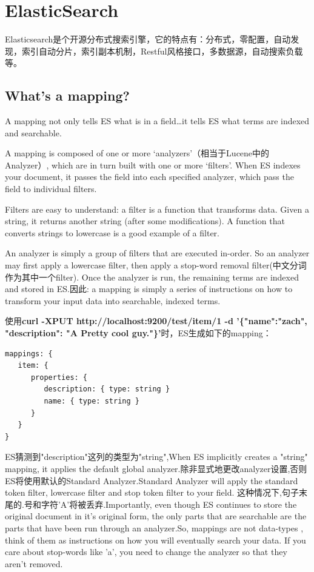 \section{ElasticSearch}
\par Elasticsearch是个开源分布式搜索引擎，它的特点有：分布式，零配置，自动发现，索引自动分片，索引副本机制，Restful风格接口，多数据源，自动搜索负载等。
\subsection{What's a mapping?}
\par A mapping not only tells ES what is in a field…it tells ES what terms are indexed and searchable.
\par A mapping is composed of one or more ‘analyzers’（相当于Lucene中的Analyzer）, which are in turn built with one or more ‘filters’. When ES indexes your document, it passes the field into each specified analyzer, which pass the field to individual filters.
\par Filters are easy to understand: a filter is a function that transforms data. Given a string, it returns another string (after some modifications). A function that converts strings to lowercase is a good example of a filter.
\par An analyzer is simply a group of filters that are executed in-order. So an analyzer may first apply a lowercase filter, then apply a stop-word removal filter(中文分词作为其中一个filter). Once the analyzer is run, the remaining terms are indexed and stored in ES.因此: a mapping is simply a series of instructions on how to transform your input data into searchable, indexed terms.
\par 使用\textbf{curl -XPUT http://localhost:9200/test/item/1 -d '\{"name":"zach", "description": "A Pretty cool guy."\}'}时，ES生成如下的mapping：
\begin{verbatim}
mappings: {
   item: {
      properties: {
         description: { type: string }
         name: { type: string }
      }
   }
}
\end{verbatim}
\par ES猜测到"description"这列的类型为"string",When ES implicitly creates a "string" mapping, it applies the default global analyzer.除非显式地更改analyzer设置,否则ES将使用默认的Standard Analyzer.Standard Analyzer will apply the standard token filter, lowercase filter and stop token filter to your field. 这种情况下,句子末尾的.号和字符'A'将被丢弃.Importantly, even though ES continues to store the original document in it’s original form, the only parts that are searchable are the parts that have been run through an analyzer.So, mappings are not data-types , think of them as instructions on how you will eventually search your data. If you care about stop-words like 'a', you need to change the analyzer so that they aren’t removed.
